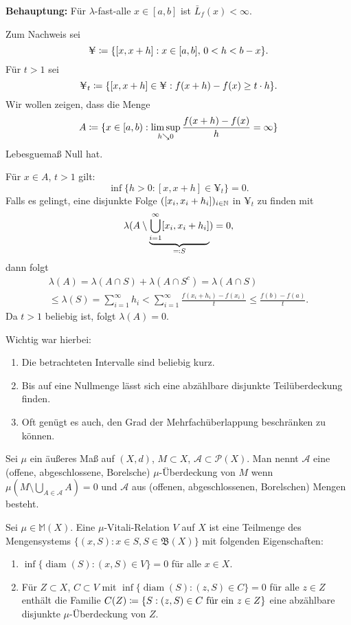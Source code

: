 \documentclass[a4paper,twoside,DIV15,BCOR12mm]{scrbook}
\newcommand{\A}{\mathcal A}
\newcommand{\borel}{\mathfrak B}
\DeclareMathOperator{\diam}{diam}
\begin{document}
\textbf{Behauptung:} Für $\lambda$-fast-alle $x\in[a,b]$ ist $\bar L_f(x)<\infty$.

Zum Nachweis sei
\[
\yen  \da \{[x,x+h]: x\in[a,b],\, 0<h<b-x\}.
\]
Für $t>1$ sei
\[
\yen_t \da \{[x,x+h] \in \yen: f(x+h) - f(x) \ge t\cdot h\}.
\]
Wir wollen zeigen, dass die Menge
\[
A\da \{x\in [a,b): \limsup_{h\searrow0} \frac{f(x+h)-f(x)}h = \infty\}
\]
Lebesguemaß Null hat.

Für $x\in A$, $t>1$ gilt:
\[
\inf\{h>0: [x,x+h ] \in \yen_t\} = 0.
\]
Falls es gelingt, eine disjunkte Folge $([x_i, x_i+h_i])_{i\in\mathbb{N}}$ in $\yen_t$ zu finden mit
\[
\lambda( A \setminus  \underbrace{\bigcup_{i=1}^\infty [x_i, x_i+h_i]}_{\ad S}) = 0,
\]
dann folgt
\begin{multline*}
\lambda(A) = \lambda(A\cap S) + \lambda(A\cap S^c) = \lambda(A\cap S)\\
\le \lambda(S) = \sum_{i=1}^\infty h_i < \sum_{i=1}^\infty \frac{f(x_i+h_i)- f(x_i)}t \le \frac{f(b)-f(a)}t.
\end{multline*}
Da $t>1$ beliebig ist, folgt $\lambda(A) = 0$.

Wichtig war hierbei:
\begin{enumerate}
\item Die betrachteten Intervalle sind beliebig kurz.
\item Bis auf eine Nullmenge lässt sich eine abzählbare disjunkte Teilüberdeckung finden.
\item Oft genügt es auch, den Grad der Mehrfachüberlappung beschränken zu können.
\end{enumerate}

\begin{definition}
Sei $\mu$ ein äußeres Maß auf $(X,d)$, $M\subset X$, $\A\subset \mathcal P(X)$. Man nennt $\A$ eine (offene, abgeschlossene, Borelsche) $\mu$-Überdeckung von $M$ wenn $\mu(M\setminus \bigcup_{A\in\A} A) = 0$ und $\A$ aus (offenen, abgeschlossenen, Borelschen) Mengen besteht.
\end{definition}

\begin{definition}
Sei $\mu\in \mathbb M(X)$. Eine $\mu$-Vitali-Relation $V$ auf $X$ ist eine Teilmenge des Mengensystems $\{(x,S): x\in S, S\in \borel(X)\}$ mit folgenden Eigenschaften:
\begin{enumerate}
\item $\inf\{\diam(S): (x,S)\in V\}=0$ für alle $x\in X$.
\item Für $Z\subset X$, $C\subset V$ mit $\inf\{\diam(S): (z,S)\in C\}=0$ für alle $z\in Z$ enthält die Familie $C(Z) \da \{S: (z,S)\in C \text{ für ein $z\in Z$}\}$ eine abzählbare disjunkte $\mu$-Überdeckung von $Z$.
\end{enumerate}
\end{definition}
\end{document}
